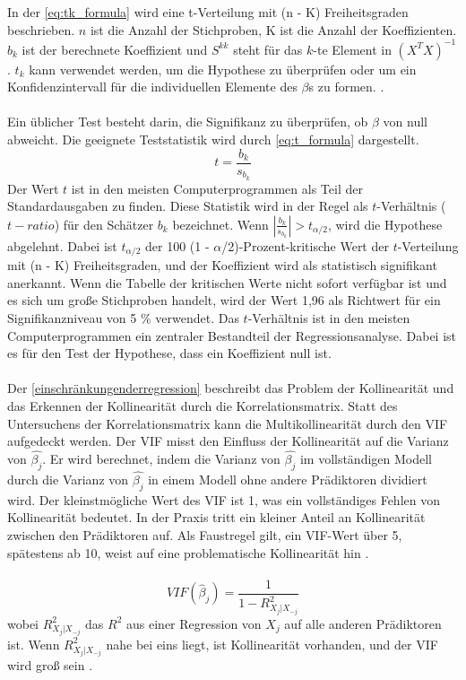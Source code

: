 In der \autoref{eq:tk_formula} wird eine t-Verteilung mit (n - K) Freiheitsgraden beschrieben. \(n\) ist die Anzahl der Stichproben, K ist die Anzahl der Koeffizienten. \(b_k\) ist der berechnete Koeffizient und $S^{kk}$ steht für das \(k\)-te Element in \((X^TX)^{-1}\). \(t_k\) kann verwendet werden, um die Hypothese zu überprüfen oder um ein Konfidenzintervall für die individuellen Elemente des $\beta$s zu formen.  \cite{greene2003econometric}.\\\\
Ein üblicher Test besteht darin, die Signifikanz zu überprüfen, ob $\beta$ von null abweicht. Die geeignete Teststatistik wird durch \autoref{eq:t_formula} dargestellt. 
\begin{equation}
t = \frac{b_k}{s_{b_k}}
\label{eq:t_formula}
\end{equation}
Der Wert \(t\) ist in den meisten Computerprogrammen als Teil der Standardausgaben zu finden. Diese Statistik wird in der Regel als \(t\)-Verhältnis (\(t-ratio\)) für den Schätzer \(b_k\) bezeichnet. Wenn \( \left|\frac{b_k}{s_{b_k}}\right| > t_{\alpha/2} \), wird die Hypothese abgelehnt. Dabei ist \( t_{\alpha/2} \) der 100 (1 - \(\alpha\)/2)-Prozent-kritische Wert der \(t\)-Verteilung mit (n - K) Freiheitsgraden, und der Koeffizient wird als statistisch signifikant anerkannt. Wenn die Tabelle der kritischen Werte nicht sofort verfügbar ist und es sich um große Stichproben handelt, wird der Wert 1,96 als Richtwert für ein Signifikanzniveau von 5 \% verwendet. Das \(t\)-Verhältnis ist in den meisten Computerprogrammen ein zentraler Bestandteil der Regressionsanalyse. Dabei ist es für den Test der Hypothese, dass ein Koeffizient null ist. \\\\
Der \autoref{einschränkungenderregression} beschreibt das Problem der Kollinearität und das Erkennen der Kollinearität durch die Korrelationsmatrix. Statt des Untersuchens der Korrelationsmatrix kann die Multikollinearität durch den \ac{VIF} aufgedeckt werden. Der \ac{VIF} misst den Einfluss der Kollinearität auf die Varianz von $\hat{\beta_j}$. Er wird berechnet, indem die Varianz von $\hat{\beta_j}$ im vollständigen Modell durch die Varianz von $\hat{\beta_j}$ in einem Modell ohne andere Prädiktoren dividiert wird. Der kleinstmögliche Wert des \ac{VIF} ist 1, was ein vollständiges Fehlen von Kollinearität bedeutet. In der Praxis tritt ein kleiner Anteil an Kollinearität zwischen den Prädiktoren auf. Als Faustregel gilt, ein \ac{VIF}-Wert über 5, spätestens ab 10, weist auf eine problematische Kollinearität hin \cite{james2013introduction}. \\\\
\begin{equation}
VIF(\hat{\beta}_j) = \frac{1}{1 - R^2_{X_j|X_{-j}}}
\label{vif}
\end{equation}
wobei \( R^2_{X_j|X_{-j}} \) das \( R^2 \) aus einer Regression von \( X_j \) auf alle anderen Prädiktoren ist. Wenn \( R^2_{X_j|X_{-j}} \) nahe bei eins liegt, ist Kollinearität vorhanden, und der VIF wird groß sein \cite{james2013introduction}.\\\\
